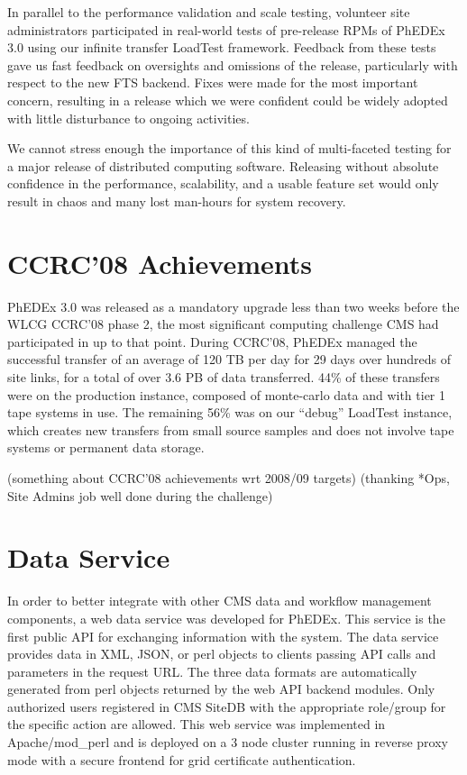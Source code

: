 \documentclass{PoS}
\begin{document}
In parallel to the performance validation and scale testing, volunteer
site administrators participated in real-world tests of pre-release
RPMs of PhEDEx 3.0 using our infinite transfer LoadTest framework.
Feedback from these tests gave us fast feedback on oversights and
omissions of the release, particularly with respect to the new FTS
backend.  Fixes were made for the most important concern, resulting in
a release which we were confident could be widely adopted with little
disturbance to ongoing activities.

We cannot stress enough the importance of this kind of multi-faceted
testing for a major release of distributed computing software.
Releasing without absolute confidence in the performance, scalability,
and a usable feature set would only result in chaos and many lost
man-hours for system recovery.

\section{CCRC'08 Achievements}

PhEDEx 3.0 was released as a mandatory upgrade less than two weeks
before the WLCG CCRC'08 phase 2, the most significant computing
challenge CMS had participated in up to that point.  During CCRC'08,
PhEDEx managed the successful transfer of an average of 120 TB per day
for 29 days over hundreds of site links, for a total of over 3.6 PB of
data transferred.  44\% of these transfers were on the production
instance, composed of monte-carlo data and with tier 1 tape systems in
use.  The remaining 56\% was on our ``debug'' LoadTest instance, which
creates new transfers from small source samples and does not involve
tape systems or permanent data storage.

(something about CCRC'08 achievements wrt 2008/09 targets) (thanking
*Ops, Site Admins job well done during the challenge)

\section{Data Service}

In order to better integrate with other CMS data and workflow
management components, a web data service was developed for PhEDEx.
This service is the first public API for exchanging information with
the system.  The data service provides data in XML, JSON, or perl
objects to clients passing API calls and parameters in the request
URL.  The three data formats are automatically generated from perl
objects returned by the web API backend modules.  Only authorized
users registered in CMS SiteDB with the appropriate role/group for the
specific action are allowed.  This web service was implemented in
Apache/mod\_perl and is deployed on a 3 node cluster running in reverse
proxy mode with a secure frontend for grid certificate authentication.
\end{document}
